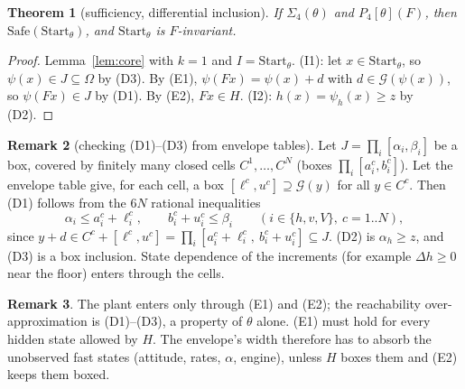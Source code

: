 \documentclass[11pt]{article}
\newtheorem{theorem}{Theorem}
\theoremstyle{definition}
\newtheorem{remark}[theorem]{Remark}
\newcommand{\Start}{\ensuremath{\mathrm{Start}}}
\newcommand{\G}{\mathcal{G}}
\begin{document}
\begin{theorem}[sufficiency, differential inclusion]\label{thm:incl}
If $\Sigma_4(\theta)$ and $P_4[\theta](F)$, then $\mathrm{Safe}(\Start_\theta)$, and $\Start_\theta$ is $F$-invariant.
\end{theorem}
\begin{proof}
Lemma~\ref{lem:core} with $k = 1$ and $I = \Start_\theta$. (I1): let $x \in \Start_\theta$, so $\psi(x) \in J \subseteq \Omega$ by (D3). By (E1), $\psi(F x) = \psi(x) + d$ with $d \in \G(\psi(x))$, so $\psi(F x) \in J$ by (D1). By (E2), $F x \in H$. (I2): $h(x) = \psi_h(x) \ge z$ by (D2).
\end{proof}

\begin{remark}[checking (D1)--(D3) from envelope tables]\label{rem:tables}
Let $J = \prod_{i}[\alpha_i, \beta_i]$ be a box, covered by finitely many closed cells $C^1, \dots, C^N$ (boxes $\prod_i [a^c_i, b^c_i]$). Let the envelope table give, for each cell, a box $[\ell^c, u^c] \supseteq \G(y)$ for all $y \in C^c$. Then (D1) follows from the $6N$ rational inequalities
\[ \alpha_i \le a^c_i + \ell^c_i, \qquad b^c_i + u^c_i \le \beta_i \qquad (i \in \{h, v, V\},\ c = 1..N), \]
since $y + d \in C^c + [\ell^c, u^c] = \prod_i [a^c_i + \ell^c_i,\ b^c_i + u^c_i] \subseteq J$. (D2) is $\alpha_h \ge z$, and (D3) is a box inclusion. State dependence of the increments (for example $\Delta h \ge 0$ near the floor) enters through the cells.
\end{remark}

\begin{remark}
The plant enters only through (E1) and (E2); the reachability over-approximation is (D1)--(D3), a property of $\theta$ alone. (E1) must hold for every hidden state allowed by $H$. The envelope's width therefore has to absorb the unobserved fast states (attitude, rates, $\alpha$, engine), unless $H$ boxes them and (E2) keeps them boxed.
\end{remark}
\end{document}
